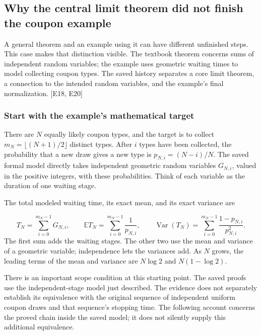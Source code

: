 \subsection[Why the central limit theorem did not finish the coupon example]{\texorpdfstring{\protect\hypertarget{l3}{}Why the central limit theorem did not finish the coupon example}{Why the central limit theorem did not finish the coupon example}}
A general theorem and an example using it can have different unfinished steps. This case makes that distinction visible. The textbook theorem concerns sums of independent random variables; the example uses geometric waiting times to model collecting coupon types. The saved history separates a core limit theorem, a connection to the intended random variables, and the example's final normalization. [E18, E20]

\subsubsection[Start with the example's mathematical target]{\texorpdfstring{\protect\hypertarget{l3-1}{}Start with the example's mathematical target}{Start with the example's mathematical target}}
There are $N$ equally likely coupon types, and the target is to collect $m_N=\lfloor(N+1)/2\rfloor$ distinct types. After $i$ types have been collected, the probability that a new draw gives a new type is $p_{N,i}=(N-i)/N$. The saved formal model directly takes independent geometric random variables $G_{N,i}$, valued in the positive integers, with these probabilities. Think of each variable as the duration of one waiting stage.

The total modeled waiting time, its exact mean, and its exact variance are

\[
T_N=\sum_{i=0}^{m_N-1}G_{N,i},\qquad
\mathbb E T_N=\sum_{i=0}^{m_N-1}\frac{1}{p_{N,i}},\qquad
\operatorname{Var}(T_N)=\sum_{i=0}^{m_N-1}\frac{1-p_{N,i}}{p_{N,i}^2}.
\]
The first sum adds the waiting stages. The other two use the mean and variance of a geometric variable; independence lets the variances add. As $N$ grows, the leading terms of the mean and variance are $N\log2$ and $N(1-\log2)$.

There is an important scope condition at this starting point. The saved proofs use the independent-stage model just described. The evidence does not separately establish its equivalence with the original sequence of independent uniform coupon draws and that sequence's stopping time. The following account concerns the proved chain inside the saved model; it does not silently supply this additional equivalence.

